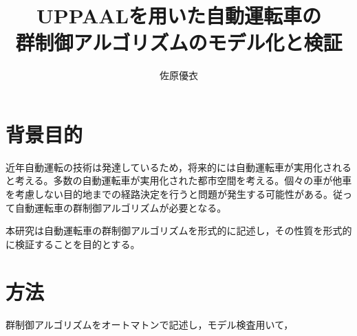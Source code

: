 \documentclass[twocolumn]{jsarticle}
\begin{document}
\title{UPPAALを用いた自動運転車の\\群制御アルゴリズムのモデル化と検証}
\author{佐原優衣}
\maketitle

\section*{背景目的}
近年自動運転の技術は発達しているため，将来的には自動運転車が実用化されると考える。多数の自動運転車が実用化された都市空間を考える。個々の車が他車を考慮しない目的地までの経路決定を行うと問題が発生する可能性がある。従って自動運転車の群制御アルゴリズムが必要となる。

本研究は自動運転車の群制御アルゴリズムを形式的に記述し，その性質を形式的に検証することを目的とする。
\section*{方法}
群制御アルゴリズムをオートマトンで記述し，モデル検査用いて，
\section*{}
\end{document}

